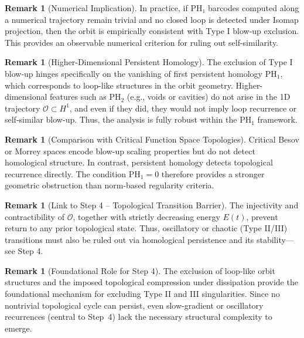 \documentclass[11pt]{article}
\theoremstyle{definition}
\newtheorem{remark}[theorem]{Remark}
\begin{document}
\begin{remark}[Numerical Implication]
In practice, if PH₁ barcodes computed along a numerical trajectory remain trivial and no closed loop is detected under Isomap projection, then the orbit is empirically consistent with Type I blow-up exclusion. This provides an observable numerical criterion for ruling out self-similarity.
\end{remark}

\begin{remark}[Higher-Dimensional Persistent Homology]
The exclusion of Type I blow-up hinges specifically on the vanishing of first persistent homology $\mathrm{PH}_1$, which corresponds to loop-like structures in the orbit geometry. Higher-dimensional features such as $\mathrm{PH}_2$ (e.g., voids or cavities) do not arise in the 1D trajectory $\mathcal{O} \subset H^1$, and even if they did, they would not imply loop recurrence or self-similar blow-up. Thus, the analysis is fully robust within the $\mathrm{PH}_1$ framework.
\end{remark}

\begin{remark}[Comparison with Critical Function Space Topologies]
Critical Besov or Morrey spaces encode blow-up scaling properties but do not detect homological structure. In contrast, persistent homology detects topological recurrence directly. The condition $\mathrm{PH}_1 = 0$ therefore provides a stronger geometric obstruction than norm-based regularity criteria.
\end{remark}

\begin{remark}[Link to Step 4 – Topological Transition Barrier]
The injectivity and contractibility of $\mathcal{O}$, together with strictly decreasing energy $E(t)$, prevent return to any prior topological state. Thus, oscillatory or chaotic (Type II/III) transitions must also be ruled out via homological persistence and its stability—see Step 4.
\end{remark}

\begin{remark}[Foundational Role for Step 4]
The exclusion of loop-like orbit structures and the imposed topological compression under dissipation provide the foundational mechanism for excluding Type II and III singularities. Since no nontrivial topological cycle can persist, even slow-gradient or oscillatory recurrences (central to Step~4) lack the necessary structural complexity to emerge.
\end{remark}
\end{document}
